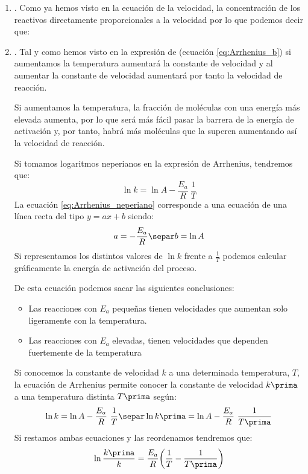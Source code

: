     \begin{enumerate}[label=\numberballmDarkTeal]
        \item {}.
        Como ya hemos visto en la ecuación de la velocidad, la concentración de los reactivos directamente proporcionales a la velocidad por lo que podemos decir que:
        \item {}.
        Tal y como hemos visto en la expresión de  (ecuación \eqref{eq:Arrhenius_b}) si aumentamos la temperatura aumentará la constante de velocidad y al aumentar la constante de velocidad aumentará por tanto la velocidad de reacción.

        Si aumentamos la temperatura, la fracción de moléculas con una energía más elevada aumenta, por lo que será más fácil pasar la barrera de la energía de activación y, por tanto, habrá más moléculas que la superen aumentando así la velocidad de reacción.

        Si tomamos logaritmos neperianos en la expresión de Arrhenius, tendremos que:
        \begin{equation}
            \ln k = \ln A - \dfrac{E_a}{R}\ \dfrac{1}{T} \label{eq:Arrhenius_neperiano}
        \end{equation}
        La ecuación \eqref{eq:Arrhenius_neperiano} corresponde a una ecuación de una línea recta del tipo $y = ax + b$ siendo:
        \begin{gather*}
            a = - \dfrac{E_a}{R}\separ
            b = \ln A
        \end{gather*}
        Si representamos los distintos valores de $\ln k$ frente a $\frac{1}{T}$ podemos calcular gráficamente la energía de activación del proceso.

        De esta ecuación podemos sacar las siguientes conclusiones:
        \begin{itemize}
            \item Las reacciones con $E_a$ pequeñas tienen velocidades que aumentan solo ligeramente con la temperatura.
            \item Las reacciones con $E_a$ elevadas, tienen velocidades que dependen fuertemente de la temperatura
        \end{itemize}
        Si conocemos la constante de velocidad $k$ a una determinada temperatura, $T$, la ecuación de Arrhenius permite conocer la constante de velocidad $k\prima$ a una temperatura distinta $T\prima$ según:
        \begin{gather*}
            \ln k = \ln A - \dfrac{E_a}{R}\ \dfrac{1}{T}\separ
            \ln k\prima = \ln A - \dfrac{E_a}{R}\ \dfrac{1}{T\prima}
        \end{gather*}
        Si restamos ambas ecuaciones y las reordenamos tendremos que:
        \begin{equation*}
            \ln\dfrac{k\prima}{k} = \dfrac{E_a}{R}\biggl( \dfrac{1}{T} - \dfrac{1}{T\prima}\biggr)
        \end{equation*}


\end{enumerate}
